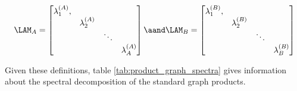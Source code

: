\begin{equation}
    \LAM_A = \begin{bmatrix}
        \lambda_1^{(A)}, & & & \\
        & \lambda_2^{(A)} & & \\
        & & \ddots & \\
        & & & \lambda_A^{(A)} \\
    \end{bmatrix}  
    \aand 
    \LAM_B = \begin{bmatrix}
        \lambda_1^{(B)}, & & & \\
        & \lambda_2^{(B)} & & \\
        & & \ddots & \\
        & & & \lambda_B^{(B)} \\
    \end{bmatrix}  
\end{equation}

Given these definitions, table \ref{tab:product_graph_spectra} gives information about the spectral decomposition of the standard graph products.


